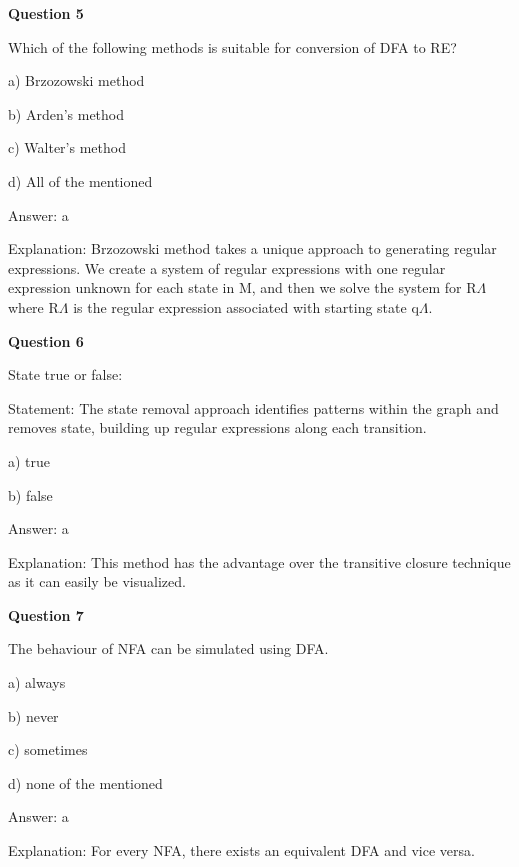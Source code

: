 \documentclass{article}
\begin{document}
\begin{mdframed}[linewidth=1pt, roundcorner=5pt, linecolor=gray!30, backgroundcolor=gray!5]
\textbf{Question 5} 

Which of the following methods is suitable for conversion of DFA to RE?

a) Brzozowski method

b) Arden's method

c) Walter's method

d) All of the mentioned
\vspace{5pt} \par
\begin{tcolorbox}[colback=green!5, colframe=green!40!black, title=Solution]
Answer: a

Explanation: Brzozowski method takes a unique approach to generating regular expressions. We create a system of regular expressions with one regular expression unknown for each state in M, and then we solve the system for R$\Lambda$ where R$\Lambda$ is the regular expression associated with starting state q$\Lambda$.
\end{tcolorbox}
\end{mdframed}
\newpage

\begin{mdframed}[linewidth=1pt, roundcorner=5pt, linecolor=gray!30, backgroundcolor=gray!5]
\textbf{Question 6} 

State true or false:

Statement: The state removal approach identifies patterns within the graph and removes state, building up regular expressions along each transition.

a) true

b) false
\vspace{5pt} \par
\begin{tcolorbox}[colback=green!5, colframe=green!40!black, title=Solution]
Answer: a

Explanation: This method has the advantage over the transitive closure technique as it can easily be visualized.
\end{tcolorbox}
\end{mdframed}

\begin{mdframed}[linewidth=1pt, roundcorner=5pt, linecolor=gray!30, backgroundcolor=gray!5]
\textbf{Question 7} 

The behaviour of NFA can be simulated using DFA.

a) always

b) never

c) sometimes

d) none of the mentioned
\vspace{5pt} \par
\begin{tcolorbox}[colback=green!5, colframe=green!40!black, title=Solution]
Answer: a

Explanation: For every NFA, there exists an equivalent DFA and vice versa.
\end{tcolorbox}
\end{mdframed}
\end{document}
